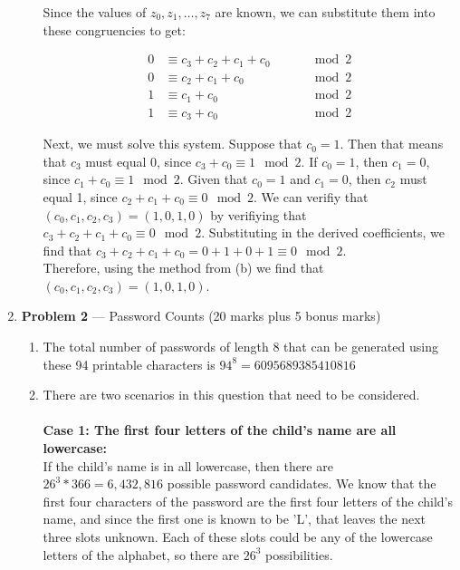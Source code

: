 \documentclass[11pt]{article}
\theoremstyle{definition}
\begin{document}
\begin{enumerate}
\begin{enumerate}
Since the values of $z_0, z_1, \ldots , z_7$ are known, we can substitute them into these congruencies to get:

\begin{align*}
0 &\equiv c_3 + c_2 + c_1 + c_0 \qquad &\mod{2}\\
0 &\equiv c_2 + c_1 + c_0 \qquad &\mod{2}\\
1 &\equiv c_1 + c_0 \qquad &\mod{2}\\
1 &\equiv c_3 + c_0 \qquad &\mod{2}
\end{align*}

Next, we must solve this system. Suppose that $c_0 = 1$. Then that means that $c_3$ must equal 0, since $c_3 + c_0 \equiv 1 \mod{2}$. If $c_0 = 1$, then $c_1 = 0$, since $c_1 + c_0 \equiv 1 \mod{2}$. Given that $c_0 = 1$ and $c_1 = 0$, then $c_2$ must equal 1,
since $c_2 + c_1 + c_0 \equiv 0 \mod{2}$. We can verifiy that $(c_0, c_1, c_2, c_3) = (1, 0, 1, 0)$ by verifiying that $c_3 + c_2 + c_1 + c_0 \equiv 0 \mod{2}$. Substituting in the derived coefficients, we find that $c_3 + c_2 + c_1 + c_0 = 0 + 1 + 0 + 1 \equiv 0 \mod{2}$.\\

Therefore, using the method from (b) we find that $(c_0, c_1, c_2, c_3) = (1, 0, 1, 0)$.

\end{enumerate}

\newpage

\item[] \textbf{Problem 2} --- Password Counts (20 marks plus 5 bonus marks)

\begin{enumerate}
\item The total number of passwords of length 8 that can be generated using these 94 printable characters is $94^8 = 6095689385410816$

\item There are two scenarios in this question that need to be considered.\\
\\ \textbf{Case 1: The first four letters of the child's name are all lowercase:}\\
If the child's name is in all lowercase, then there are $26^3 * 366 = 6,432,816$ possible password candidates. We know that the first
four characters of the password are the first four letters of the child's name, and since the first one is known to be 'L', that leaves
the next three slots unknown. Each of these slots could be any of the lowercase letters of the alphabet, so there are $26^3$
possibilities.\\


\end{enumerate}
\end{enumerate}
\end{document}
